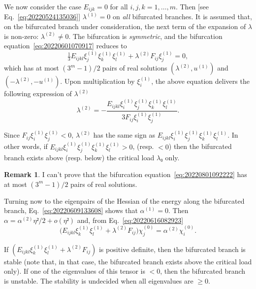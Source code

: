 \documentclass[12pt, final]{scrartcl}
\theoremstyle{definition}
\newtheorem{remark}{Remark}
\newcommand{\order}[2][1]{#2^{(#1)}}
\begin{document}
We now consider the case $E_{ijk}=0$ for all $i, j, k = 1, \ldots, m$. Then
[see Eq.~\eqref{eq:20220524135036}] $\order[1]λ = 0$ on \emph{all} bifurcated
branches. It is assumed that, on the bifurcated branch under consideration, the
next term of the expansion of $λ$ is non-zero: $\order[2]λ ≠ 0$. The bifurcation is
\emph{symmetric}, and the bifurcation equation~\eqref{eq:20220601070917} reduces
to
\begin{equation}
  \label{eq:20220801092222}
  \tfrac{1}{3} E_{ijkl} \order[1]{ξ_j} \order[1]{ξ_k} \order[1]{ξ_l}  + \order[2]λ F_{ij} \order[1]{ξ_j} = 0,
\end{equation}
which has at most $(3^m - 1) / 2$ pairs of real solutions $(\order[2]λ, \order[1]u)$ and
$(- \order[2]λ, - \order[1]u)$. Upon multiplication by $\order[1]{ξ_i}$, the above equation delivers
the following expression of $\order[2]λ$
\begin{equation}
  \label{eq:20220801093236}
  \order[2]λ = -\frac{E_{ijkl} \order[1]{ξ_i} \order[1]{ξ_j} \order[1]{ξ_k} \order[1]{ξ_l}}{3 F_{ij} \order[1]{ξ_i} \order[1]{ξ_j}}.
\end{equation}

Since $F_{ij} \order[1]{ξ_i} \order[1]{ξ_j} < 0$, $\order[2]λ$ has the same sign as
$E_{ijkl}\order[1]{ξ_i} \order[1]{ξ_j} \order[1]{ξ_k} \order[1]{ξ_l}$. In other words, if
$E_{ijkl}\order[1]{ξ_i} \order[1]{ξ_j} \order[1]{ξ_k} \order[1]{ξ_l} > 0$, (resp. $<0$) then the bifurcated branch
exists above (resp. below) the critical load $λ₀$ only.

\begin{remark}
  I can't prove that the bifurcation equation~\eqref{eq:20220801092222} has at
  most $(3^m - 1) / 2$ pairs of real solutions.
\end{remark}

Turning now to the eigenpairs of the Hessian of the energy along
the bifurcated branch, Eq.~\eqref{eq:20220609133608} shows that $\order[1]α = 0$. Then
$α = \order[2]α η² / 2 + o(η²)$ and, from Eq.~\eqref{eq:20220616082923}
\begin{equation}
  \bigl(E_{ijkl} \order[1]{ξ_k} \order[1]{ξ_l} + \order[2]λ F_{ij} \bigr) \order[0]{χ_j} = \order[2]α \order[0]{χ_i}.
\end{equation}

If $(E_{ijkl} \order[1]{ξ_k} \order[1]{ξ_l} + \order[2]λ F_{ij} )$ is positive definite, then the
bifurcated branch is stable (note that, in that case, the bifurcated branch
exists above the critical load only). If one of the eigenvalues of this tensor
is $<0$, then the bifurcated branch is unstable. The stability is undecided
when all eigenvalues are $≥ 0$.
\end{document}
